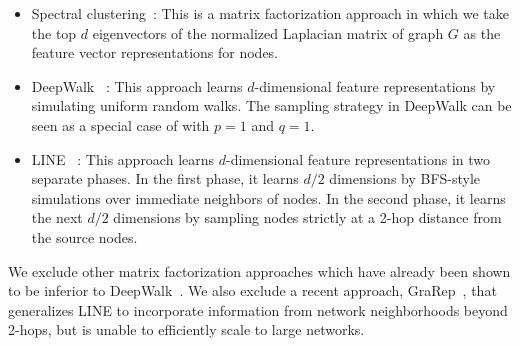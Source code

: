 \begin{itemize}[noitemsep,nolistsep]
	\item Spectral clustering~\cite{spectral}: This is a matrix factorization approach in which we take the top $d$ eigenvectors of the normalized Laplacian matrix of graph $G$ as the feature vector representations for nodes.
	\item DeepWalk 
	~\cite{deepwalk}: This approach learns $d$-dimensional feature representations by simulating uniform random walks. The sampling strategy in DeepWalk can be seen as a special case of \nodevec with $p=1$ and $q=1$.
	\item LINE 
	~\cite{line}: This approach learns $d$-dimensional feature representations in two separate phases. In the first phase, it learns $d/2$ dimensions by BFS-style simulations over immediate neighbors of nodes. In the second phase, it learns the next $d/2$ dimensions by sampling nodes strictly at a 2-hop distance from the source nodes. 
\end{itemize}

We exclude other matrix factorization approaches which have already been shown to be inferior %
to DeepWalk~\cite{deepwalk}. We also exclude a recent approach, GraRep~\cite{grarep}, that generalizes LINE to incorporate information from network neighborhoods beyond 2-hops, but is unable to efficiently scale to large networks. 

